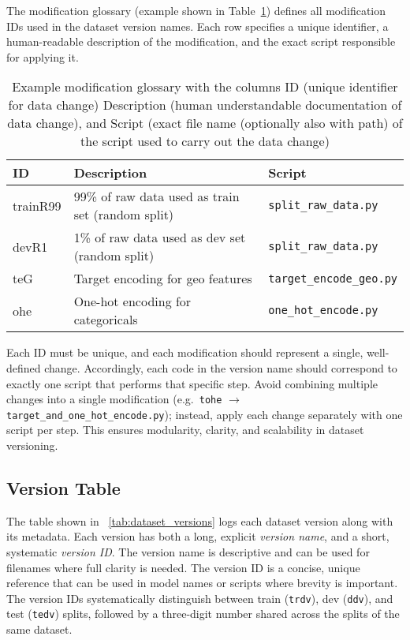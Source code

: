 \documentclass[12pt,openany]{book}
\begin{document}
The modification glossary (example shown in Table~\ref{tab:mod_glossary}) defines all modification IDs used in the dataset version names. Each row specifies a unique identifier, a human-readable description of the modification, and the exact script responsible for applying it. 

\begin{table}[h!]
\centering
\renewcommand{\arraystretch}{1.3}
\caption{Example modification glossary with the columns ID (unique identifier for data change) Description (human understandable documentation of data change), and Script (exact file name (optionally also with path) of the script used to carry out the data change)}
\label{tab:mod_glossary}
\begin{tabular}{|l|p{9.5cm}|p{4.2cm}|}
\hline
\textbf{ID} & \textbf{Description} & \textbf{Script} \\
\hline
trainR99 & 99\% of raw data used as train set (random split) & \texttt{split\_raw\_data.py} \\
devR1    & 1\% of raw data used as dev set (random split) & \texttt{split\_raw\_data.py} \\
teG      & Target encoding for geo features & \texttt{target\_encode\_geo.py} \\
ohe      & One-hot encoding for categoricals & \texttt{one\_hot\_encode.py} \\
\hline
\end{tabular}
\end{table}

Each ID must be unique, and each modification should represent a single, well-defined change. Accordingly, each code in the version name should correspond to exactly one script that performs that specific step. Avoid combining multiple changes into a single modification (e.g.\ \texttt{tohe} \(\rightarrow\) \texttt{target\_and\_one\_hot\_encode.py}); instead, apply each change separately with one script per step. This ensures modularity, clarity, and scalability in dataset versioning.


\subsection{Version Table}

The table shown in ~\ref{tab:dataset_versions} logs each dataset version along with its metadata. Each version has both a long, explicit \textit{version name}, and a short, systematic \textit{version ID}. The version name is descriptive and can be used for filenames where full clarity is needed. The version ID is a concise, unique reference that can be used in model names or scripts where brevity is important. The version IDs systematically distinguish between train (\texttt{trdv}), dev (\texttt{ddv}), and test (\texttt{tedv}) splits, followed by a three-digit number shared across the splits of the same dataset.
\end{document}
